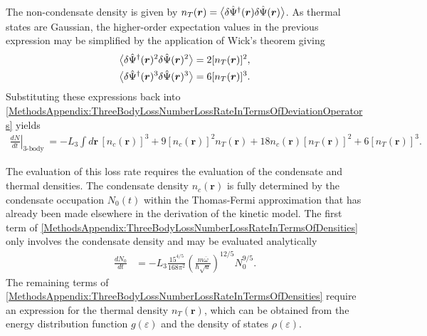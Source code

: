 The non-condensate density is given by $n_T(\bm{r}) = {\big<\delta\hat{\Psi}^\dagger(\bm{r}) \delta\hat{\Psi}(\bm{r})\big>}$.  As thermal states are Gaussian, the higher-order expectation values in the previous expression may be simplified by the application of Wick's theorem \citep{Wick:1950} giving
\begin{align}
    {\ensuremath{\big<\delta\hat{\Psi}^\dagger(\bm{r})^2 \delta\hat{\Psi}(\bm{r})^2\big>}} &= 2 [n_T(\bm{r})]^2, \\
    {\big<\delta\hat{\Psi}^\dagger(\bm{r})^3 \delta\hat{\Psi}(\bm{r})^3\big>} &= 6 [n_T(\bm{r})]^3.
\end{align}
Substituting these expressions back into \eqref{MethodsAppendix:ThreeBodyLossNumberLossRateInTermsOfDeviationOperators} yields
\begin{align}
    \left.\frac{d N}{dt} \right|_\text{3-body loss} &=  -L_3 \int d \bm{r}\, [n_c(\bm{r})]^3 + 9 [n_c(\bm{r})]^2 n_T(\bm{r}) + 18 n_c(\bm{r}) [n_T(\bm{r})]^2 + 6 [n_T(\bm{r})]^3.
    \label{MethodsAppendix:ThreeBodyLossNumberLossRateInTermsOfDensities}
\end{align}

The evaluation of this loss rate requires the evaluation of the condensate and thermal densities.  The condensate density $n_c(\bm{r})$ is fully determined by the condensate occupation $N_0(t)$ within the Thomas-Fermi approximation that has already been made elsewhere in the derivation of the kinetic model.  The first term of \eqref{MethodsAppendix:ThreeBodyLossNumberLossRateInTermsOfDensities} only involves the condensate density and may be evaluated analytically
\begin{align}
    \frac{d N_0}{dt} &= - L_3 \frac{15^{4/5}}{168 \pi^2} \left(\frac{m \overline{\omega}}{\hbar \sqrt{a}} \right)^{12/5} N_0^{9/5}.
\end{align}
The remaining terms of \eqref{MethodsAppendix:ThreeBodyLossNumberLossRateInTermsOfDensities} require an expression for the thermal density $n_T(\bm{r})$, which can be obtained from the energy distribution function $g(\varepsilon)$ and the density of states $\rho(\varepsilon)$.


